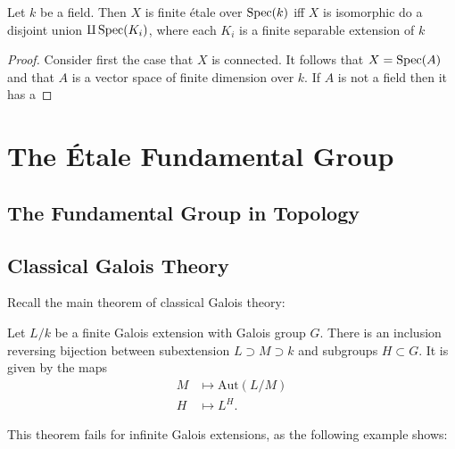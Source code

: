 \begin{proposition}
Let $k$ be a field. Then $X$ is finite \'etale over $\operatorname{Spec}(k)$ iff $X$ is isomorphic do a disjoint union $\amalg \operatorname{Spec}(K_i)$, where each $K_i$ is a finite separable extension of $k$
\end{proposition}
\begin{proof}
  Consider first the case that $X$ is connected. It follows that $X = \operatorname{Spec}(A)$ and that $A$ is a vector space of finite dimension over $k$. If $A$ is not a field then it has a
\end{proof}


\section{The \'Etale Fundamental Group}
\subsection{The Fundamental Group in Topology}
\subsection{Classical Galois Theory}
Recall the main theorem of classical Galois theory:
\begin{theorem}
  Let $L/k$ be a finite Galois extension with Galois group $G$. There is an inclusion reversing bijection between subextension $ L \supset M \supset k$ and subgroups $H \subset G$. It is given by the maps
  \begin{align*}
    M &\mapsto \text{Aut}(L/M) \\
    H &\mapsto L^H.
  \end{align*}
\end{theorem}
This theorem fails for infinite Galois extensions, as the following example shows:
